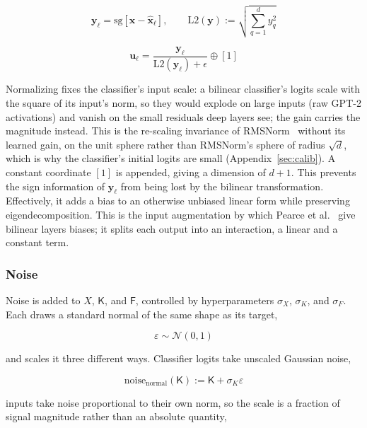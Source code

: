\begin{equation}
	\mathbf{y}_\ell = \mathrm{sg}\!\left[\mathbf{x} - \hat{\mathbf{x}}_\ell\right],
	\qquad
	\mathrm{L2}(\mathbf{y}) := \sqrt{\sum^{d}_{q=1} y_q^2}
	\label{eq:L2}
\end{equation}

\begin{equation}
	\mathbf{u}_\ell =
	\frac{\mathbf{y}_\ell}{\mathrm{L2}(\mathbf{y}_\ell) + \epsilon} \oplus [1]
	\label{eq:y_norm}
\end{equation}

Normalizing fixes the classifier's input scale: a bilinear classifier's
logits scale with the square of its input's norm, so they would explode
on large inputs (raw GPT-2 activations) and vanish on the small residuals
deep layers see; the gain carries the magnitude instead. This is the
re-scaling invariance of RMSNorm~\cite{zhang2019rms} without its learned
gain, on the unit sphere rather than RMSNorm's sphere of radius
$\sqrt{d}$, which is why the classifier's initial logits are small
(Appendix~\ref{sec:calib}).
A constant coordinate $[1]$ is appended, giving a dimension of $d+1$.
This prevents the sign information of $\mathbf{y}_\ell$ from being lost
by the bilinear transformation.
Effectively, it adds a bias to an otherwise unbiased linear form
while preserving eigendecomposition. This is the input augmentation by
which Pearce et al.~\cite{pearce2025} give bilinear layers biases; it
splits each output into an interaction, a linear and a constant term.

\subsubsection{Noise}
\label{sec:noise}
Noise is added to $X$, $\mathsf{K}$, and $\mathsf{F}$, controlled by
hyperparameters $\sigma_X$, $\sigma_K$, and $\sigma_F$. Each draws a
standard normal of the same shape as its target,

\begin{equation}
	\varepsilon \sim \mathcal{N}(0,1)
\end{equation}

and scales it three different ways. Classifier logits take unscaled
Gaussian noise,

\begin{equation}
	\mathrm{noise}_{\mathrm{normal}}(\mathsf{K}) :=
	\mathsf{K} + \sigma_K\varepsilon
	\label{eq:noise_normal}
\end{equation}

inputs take noise proportional to their own norm, so the scale is a
fraction of signal magnitude rather than an absolute quantity,

